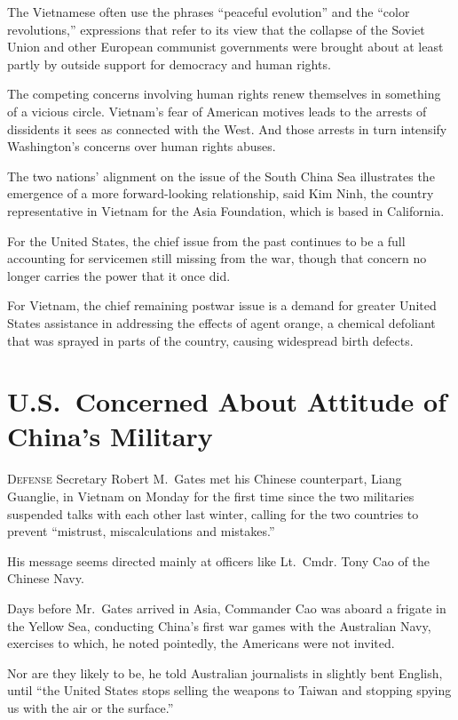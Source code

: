 ﻿\documentclass[12pt]{article}
\begin{document}
The Vietnamese often use the phrases ``peaceful evolution'' and the ``color revolutions,''
expressions that refer to its view that the collapse of the Soviet Union and other European
communist governments were brought about at least partly by outside support for democracy and human
rights.

The competing concerns involving human rights renew themselves in something of a vicious circle.
Vietnam's fear of American motives leads to the arrests of dissidents it sees as connected with the
West. And those arrests in turn intensify Washington's concerns over human rights abuses.

The two nations' alignment on the issue of the South China Sea illustrates the emergence of a more
forward-looking relationship, said Kim Ninh, the country representative in Vietnam for the Asia
Foundation, which is based in California.

For the United States, the chief issue from the past continues to be a full accounting for
servicemen still missing from the war, though that concern no longer carries the power that it once
did.

For Vietnam, the chief remaining postwar issue is a demand for greater United States assistance in
addressing the effects of agent orange, a chemical defoliant that was sprayed in parts of the
country, causing widespread birth defects.

\section{U.S.~Concerned About Attitude of China's Military}

\lettrine{D}{efense} Secretary Robert M.~Gates met his Chinese counterpart,
Liang Guanglie, in Vietnam on Monday for the first time since the two militaries suspended talks
with each other last winter, calling for the two countries to prevent ``mistrust, miscalculations
and mistakes.''

His message seems directed mainly at officers like Lt.~Cmdr. Tony Cao of the Chinese Navy.

Days before Mr.~Gates arrived in Asia, Commander Cao was aboard a frigate in the Yellow Sea,
conducting China's first war games with the Australian Navy, exercises to which, he noted pointedly,
the Americans were not invited.

Nor are they likely to be, he told Australian journalists in slightly bent English, until ``the
United States stops selling the weapons to Taiwan and stopping spying us with the air or the
surface.''
\end{document}
